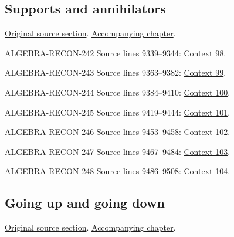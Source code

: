 \subsection{Supports and annihilators}
\hypertarget{algebra-source-section-supp-and-ann}{}
\noindent\href{https://github.com/stacks/stacks-project/blob/a04446e57ec1fbc252a871afcec7752fb2807b14/algebra.tex\#L9307}{Original source section}. \href{algebra.pdf\#nameddest=section-supp-and-ann}{Accompanying chapter}.

\begin{AlgebraSourceRoutes}
\item[ALGEBRA-RECON-242] Source lines 9339--9344: \hyperlink{algebra-context-098}{Context 98}.
\item[ALGEBRA-RECON-243] Source lines 9363--9382: \hyperlink{algebra-context-099}{Context 99}.
\item[ALGEBRA-RECON-244] Source lines 9384--9410: \hyperlink{algebra-context-100}{Context 100}.
\item[ALGEBRA-RECON-245] Source lines 9419--9444: \hyperlink{algebra-context-101}{Context 101}.
\item[ALGEBRA-RECON-246] Source lines 9453--9458: \hyperlink{algebra-context-102}{Context 102}.
\item[ALGEBRA-RECON-247] Source lines 9467--9484: \hyperlink{algebra-context-103}{Context 103}.
\item[ALGEBRA-RECON-248] Source lines 9486--9508: \hyperlink{algebra-context-104}{Context 104}.
\end{AlgebraSourceRoutes}

\subsection{Going up and going down}
\hypertarget{algebra-source-section-going-up}{}
\noindent\href{https://github.com/stacks/stacks-project/blob/a04446e57ec1fbc252a871afcec7752fb2807b14/algebra.tex\#L9514}{Original source section}. \href{algebra.pdf\#nameddest=section-going-up}{Accompanying chapter}.

